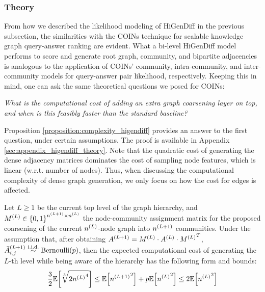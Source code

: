 \begin{itemize}
\end{itemize}

\subsubsection{Theory}
From how we described the likelihood modeling of HiGenDiff in the previous subsection, the similarities with the COINs technique for scalable knowledge graph query-answer ranking are evident. What a bi-level HiGenDiff model performs to score and generate root graph, community, and bipartite adjacencies is analogous to the application of COINs' community, intra-community, and inter-community models for query-answer pair likelihood, respectively. Keeping this in mind, one can ask the same theoretical questions we posed for COINs: 
\begin{center}
    \emph{What is the computational cost of adding an extra graph coarsening layer on top, and when is this feasibly faster than the standard baseline?}
\end{center}
Proposition \ref{proposition:complexity_higendiff} provides an answer to the first question, under certain assumptions. The proof is available in Appendix \ref{sec:appendix_higendiff_theory}. Note that the quadratic cost of generating the dense adjacency matrices dominates the cost of sampling node features, which is linear (w.r.t. number of nodes). Thus, when discussing the computational complexity of dense graph generation, we only focus on how the cost for edges is affected.

\begin{proposition}
    \label{proposition:complexity_higendiff}
    Let $L \geq 1$ be the current top level of the graph hierarchy, and $M^{\mathopen{}\left(L\right)} \in \mathopen{}\left\{0,1\right\}^{n^{\mathopen{}\left(L+1\right)}\times n^{\mathopen{}\left(L\right)}}$ the node-community assignment matrix for the proposed coarsening of the current $n^{\mathopen{}\left(L\right)}$-node graph into $n^{\mathopen{}\left(L+1\right)}$ communities. Under the assumption that, after obtaining $A^{\mathopen{}\left(L+1\right)}=M^{\mathopen{}\left(L\right)} \cdot A^{\mathopen{}\left(L\right)} \cdot {M^{\mathopen{}\left(L\right)}}^T$, $\bar{A}_{i,j}^{\mathopen{}\left(L+1\right)} \overset{\text{i.i.d.}}{\sim} \text{Bernoulli}\mathopen{}\left(p\right)$, then the expected computational cost of generating the $L$-th level while being aware of the hierarchy has the following form and bounds:
    \begin{equation}
         \frac{3}{2}\mathbb{E}\mathopen{}\left[\sqrt[3]{2{n^{\mathopen{}\left(L\right)}}^4}\right] \leq \mathbb{E}\mathopen{}\left[{n^{\mathopen{}\left(L+1\right)}}^2\right] + p \mathbb{E}\mathopen{}\left[{n^{\mathopen{}\left(L\right)}}^2\right] \leq 2\mathbb{E}\mathopen{}\left[{n^{\mathopen{}\left(L\right)}}^2\right]
    \end{equation}
\end{proposition}

